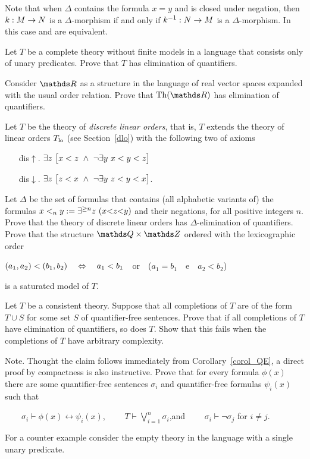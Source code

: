 Note that when $\Delta$ contains the formula $x=y$ and is closed under negation, then  $k:M\rightarrow N$ is a $\Delta$-morphism if and only if $k^{-1}:N\rightarrow M$ is a $\Delta$-morphism. In this case  and  are equivalent.

\begin{exercise}
Let $T$ be a complete theory without finite models in a language that consists only of unary predicates. Prove that $T$ has elimination of quantifiers.\QED
\end{exercise}

\begin{exercise}
Consider $\RR$ as a structure in the language of real vector spaces expanded with the usual order relation. Prove that $\Th(\RR)$ has elimination of quantifiers.\QED
\end{exercise}

\begin{exercise}\label{ex_discrete_lo}
Let $T$ be the theory of \emph{discrete linear orders}, that is, $T$ extends the theory of linear orders $T_{\rm lo}$  (see Section~\ref{dlo}) with the following two of axioms
\begin{itemize}
\item[dis$\uparrow$.] $\E z\ \big[x<z\ \wedge\ \neg\E y\ x<y<z\big]$
\item[dis$\downarrow$.] $\E z\ \big[ z<x\ \wedge\ \neg\E y\ z<y<x\big]$.
\end{itemize}
Let $\Delta$ be the set of formulas that contains (all alphabetic variants of) the formulas $x<_ny:=\E^{\ge n}z\ (x\mathord<z\mathord< y)$ and their negations, for all positive integers $n$. Prove that the theory of discrete linear orders has $\Delta$-elimination of quantifiers. Prove that the structure $\QQ\times\ZZ$ ordered with the lexicographic order 

\hfil$(a_1,a_2)<(b_1,b_2)\quad\Leftrightarrow\quad a_1<b_1$\ \ or\ \ ($a_1=b_1$\ \ e\ \ $a_2<b_2$)

is a saturated model of $T$.\QED
\end{exercise}



\begin{exercise}
Let $T$ be a consistent theory. Suppose that all completions of $T$ are of the form 
$T\cup S$ for some set $S$ of quantifier-free sentences. Prove that if all completions of $T$ have elimination of quantifiers, so does $T$. Show that this fails when the completions of $T$ have arbitrary complexity. 

Note. Thought the claim follows immediately from Corollary~\ref{corol_QE}, a direct proof by compactness is also instructive. Prove that for every formula $\phi(x)$ there are some quantifier-free sentences $\sigma_i$ and quantifier-free formulas $\psi_i(x)$ such that

$\displaystyle\qquad\sigma_i\vdash\phi(x)\leftrightarrow\psi_i(x)$, 
$\qquad\displaystyle T\vdash\bigvee^n_{i=1}\sigma_i$,\qquad and  $\qquad\sigma_i\vdash\neg\sigma_j$ for $i\neq j$.

For a counter example consider the empty theory in the language with a single unary predicate.\QED
\end{exercise}


